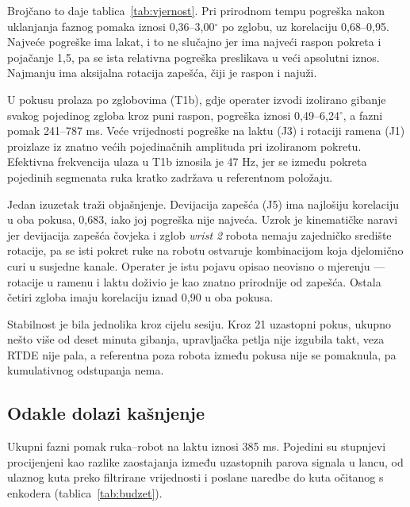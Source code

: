 Brojčano to daje tablica~\ref{tab:vjernost}. Pri prirodnom tempu pogreška nakon
uklanjanja faznog pomaka iznosi 0,36--3,00$^\circ$ po zglobu, uz korelaciju
0,68--0,95. Najveće pogreške ima lakat, i to ne slučajno jer ima najveći raspon
pokreta i pojačanje 1,5, pa se ista relativna pogreška preslikava u veći
apsolutni iznos. Najmanju ima aksijalna rotacija zapešća, čiji je raspon i
najuži.

\begin{table}[t]
  \caption{Vjernost oponašanja po zglobu usporedbom kuta ruke i stvarnog kuta robota.
  RMSE$_\text{p}$ je pogreška nakon uklanjanja faznog pomaka $\tau$.}
  \label{tab:vjernost}
  \centering\small
  
\end{table}

U pokusu prolaza po zglobovima (T1b), gdje operater izvodi izolirano gibanje svakog pojedinog zgloba kroz puni raspon, pogreška iznosi 0,49--6,24$^\circ$, a fazni pomak 241--787 ms. Veće vrijednosti pogreške na laktu (J3) i rotaciji ramena (J1) proizlaze iz znatno većih pojedinačnih amplituda pri izoliranom pokretu. Efektivna frekvencija ulaza u T1b iznosila je 47 Hz, jer se između pokreta pojedinih segmenata ruka kratko zadržava u referentnom položaju.

Jedan izuzetak traži objašnjenje. Devijacija zapešća (J5) ima najlošiju
korelaciju u oba pokusa, 0,683, iako joj pogreška nije najveća. Uzrok je
kinematičke naravi jer devijacija zapešća čovjeka i zglob \emph{wrist 2} robota nemaju
zajedničko središte rotacije, pa se isti pokret ruke na robotu ostvaruje
kombinacijom koja djelomično curi u susjedne kanale. Operater je istu pojavu
opisao neovisno o mjerenju --- rotacije u ramenu i laktu doživio je kao znatno
prirodnije od zapešća. Ostala četiri zgloba imaju korelaciju iznad 0,90 u oba
pokusa.

Stabilnost je bila jednolika kroz cijelu sesiju. Kroz 21 uzastopni pokus,
ukupno nešto više od deset minuta gibanja, upravljačka petlja nije izgubila
takt, veza RTDE nije pala, a referentna poza robota između pokusa nije se
pomaknula, pa kumulativnog odstupanja nema.

\subsection{Odakle dolazi kašnjenje}

Ukupni fazni pomak ruka--robot na laktu iznosi 385 ms. Pojedini su stupnjevi procijenjeni kao razlike zaostajanja između uzastopnih parova signala u lancu, od ulaznog kuta preko filtrirane vrijednosti i poslane naredbe do kuta očitanog s enkodera (tablica~\ref{tab:budzet}).

